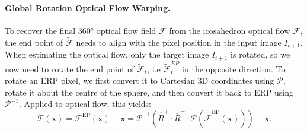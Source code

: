 \paragraph{Global Rotation Optical Flow Warping.}
To recover the final 360° optical flow field $\mathcal{F}$ from the icosahedron optical flow $\tilde{\mathcal{F}}$, the end point of $\tilde{\mathcal{F}}$ needs to align with the pixel position in the input image $I_{t+1}$.
% 
When estimating the optical flow, only the target image $I_{t+1}$ is rotated, so we now need to rotate the end point of $\tilde{\mathcal{F}}_t$, i.e $\tilde{\mathcal{F}}^{EP}_t$ in the opposite direction.
%
To rotate an ERP pixel, we first convert it to Cartesian 3D coordinates using $\mathcal{P}$, rotate it about the centre of the sphere, and then convert it back to ERP using $\mathcal{P}^{-1}$.
%
Applied to optical flow, this yields:
%
\begin{equation}\label{equ:approach:globalwarp}
	\mathcal{F}(\mathbf{x})
	= \mathcal{F}^\text{EP}(\mathbf{x}) - \mathbf{x}
	= \mathcal{P}^{-1} \left( \hat{R}^\top \cdot \bar{R}^\top \cdot \mathcal{P}(\tilde{\mathcal{F}}^\text{EP}(\mathbf{x}))\right)  - \mathbf{x}
	\text{.}
\end{equation}

